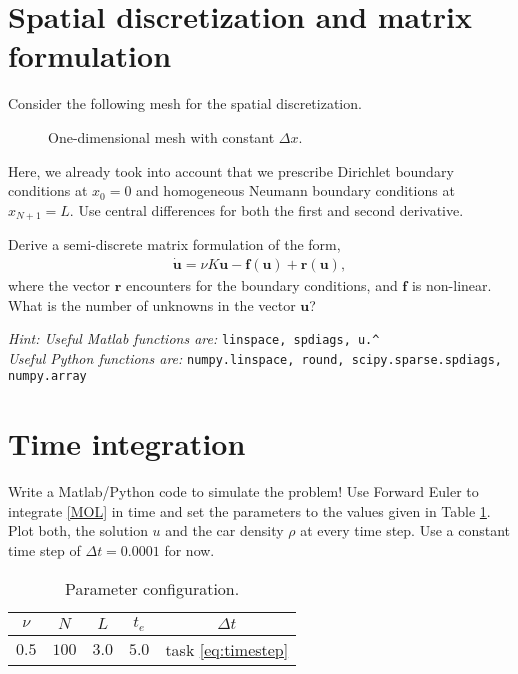 \documentclass[a4paper,10pt]{article}
\begin{document}
\section{Spatial discretization and matrix formulation}
Consider the following mesh for the spatial discretization.
\begin{figure}[ht]
\centering
{}
\caption{One-dimensional mesh with constant $\Delta x$.}
\end{figure}
Here, we already took into account that we prescribe Dirichlet boundary conditions at $x_0 = 0$ and homogeneous Neumann boundary conditions at $x_{N+1} = L$. Use central differences for both the first and second derivative.

Derive a semi-discrete matrix formulation of the form,
\begin{align}
\label{MOL}
\dot{\mathbf{u}} = \nu K \mathbf{u} - \mathbf{f}(\mathbf{u}) + \mathbf{r}(\mathbf{u}),
\end{align}
where the vector $\mathbf{r}$ encounters for the boundary conditions, and $\mathbf{f}$ is non-linear. What is the number of unknowns in the vector $\mathbf{u}$?

\textit{Hint: Useful Matlab functions are: } \texttt{linspace, spdiags, u.\^ }\\
\textit{\phantom{\indent Hint:} Useful Python functions are: } \texttt{numpy.linspace, round, scipy.sparse.spdiags,}\\
 \texttt{numpy.array}
\section{Time integration}
\label{ch:euler}
Write a Matlab/Python code to simulate the problem! Use Forward Euler to integrate \eqref{MOL} in time and set the parameters to the values given in Table \ref{params1}. Plot both, the solution $u$ and the car density $\rho$ at every time step. Use a constant time step of $\Delta t = 0.0001$ for now.
\begin{table}[ht]
\centering
 \begin{tabular}{|c|c|c|c|c|}
  \hline
  $\nu$ & $N$ & $L$ & $t_e$ & $\Delta t$\\
  \hline
  $0.5$ & $100$ & $3.0$ & $5.0$ & task \ref{eq:timestep}\\
  \hline
 \end{tabular}
\caption{Parameter configuration.}\label{params1}
\end{table}
\end{document}

